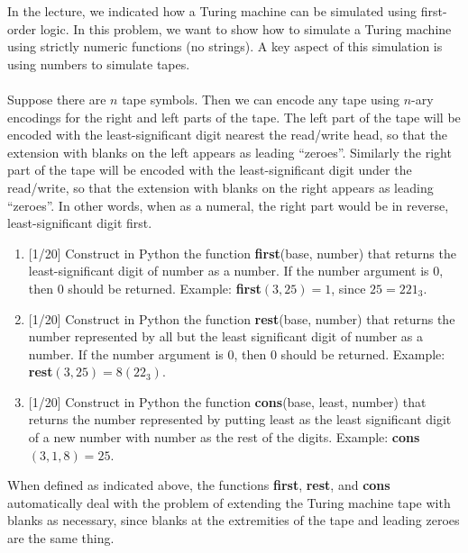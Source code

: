 \documentclass[12pt,letterpaper,boxed,cm]{hmcpset}
\newcommand{\tb}[1]{\textbf{#1}}
\begin{document}
\begin{problem}[3.]
    [20 points] In the lecture, we indicated how a Turing machine can be simulated using first-order logic. In this problem, we want to show how to simulate a Turing machine using strictly numeric functions (no strings). A key aspect of this simulation is using numbers to simulate tapes. \\\\
    Suppose there are $n$ tape symbols. Then we can encode any tape using $n$-ary encodings for the right and left parts of the tape. The left part of the tape will be encoded with the least-significant digit nearest the read/write head, so that the extension with blanks on the left appears as leading ``zeroes''. Similarly the right part of the tape will be encoded with the least-significant digit under the read/write, so that the extension with blanks on the right appears as leading ``zeroes''. In other words, when as a numeral, the right part would be in reverse, least-significant digit first.
    \begin{enumerate}[label=\alph*.]
        \item {[1/20]} Construct in Python the function \tb{first}(base, number) that returns the least-significant digit of number as a number. If the number argument is 0, then 0 should be returned. Example: \tb{first}$(3, 25) = 1$, since $25 = 221_3$.
        \item {[1/20]} Construct in Python the function \tb{rest}(base, number) that returns the number represented by all but the least significant digit of number as a number. If the number argument is 0, then 0 should be returned. Example: \tb{rest}$(3, 25) = 8 (22_3)$.
        \item {[1/20]} Construct in Python the function \tb{cons}(base, least, number) that returns the number represented by putting least as the least significant digit of a new number with number as the rest of the digits. Example: \tb{cons}$(3, 1, 8) = 25$.
    \end{enumerate}
    When defined as indicated above, the functions \tb{first}, \tb{rest}, and \tb{cons} automatically deal with the problem of extending the Turing machine tape with blanks as necessary, since blanks at the extremities of the tape and leading zeroes are the same thing.
    \end{problem}
\end{document}
